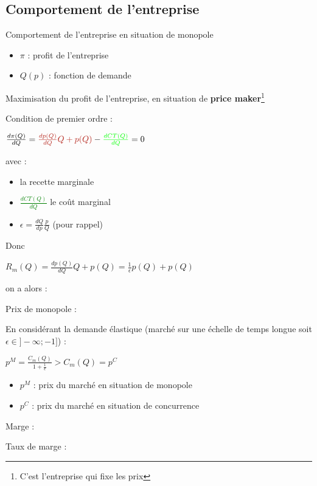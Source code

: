 \subsection{Comportement de l'entreprise}
Comportement de l'entreprise en situation de monopole
\begin{itemize}
    \item $\pi$ : profit de l'entreprise
    \item $Q(p)$ : fonction de demande
\end{itemize}
Maximisation du profit de l'entreprise, en situation de \textbf{price maker}\footnote{C'est l'entreprise qui fixe les prix}
\begin{center}
    \Large{}
\end{center}
Condition de premier ordre :
\begin{center}
    \Large{}
\end{center}
\begin{center}
    \Large{$\frac{d\pi(Q)}{dQ} = \textcolor{BrickRed}{\frac{dp(Q)}{dQ}Q + p(Q)} - \textcolor{green}{\frac{dCT(Q)}{dQ}} = 0$}
\end{center} avec :
\begin{itemize}
    \item{} la recette marginale
    \item \textcolor{green}{$\frac{dCT(Q)}{dQ}$} le coût marginal
    \item $\epsilon = \frac{dQ}{dp}\frac{p}{Q}$ (pour rappel)
\end{itemize}
Donc
\begin{center}
    $R_{m}(Q) = \frac{dp(Q)}{dQ}Q + p(Q) = \frac{1}{\epsilon}p(Q) + p(Q)$
\end{center}
on a alors : 
\begin{center}
    \Large{}
\end{center}
\newpage
Prix de monopole :
\begin{center}
    \LARGE{}
\end{center}
En considérant la demande élastique (marché sur une échelle de temps longue soit $\epsilon \in ]-\infty;-1]$) :
\begin{center}
    \Large{$p^{M} = \frac{C_{m}(Q)}{1+\frac{1}{\epsilon}} > C_{m}(Q) = p^{C}$}
\end{center}
\begin{itemize}
    \item $p^{M}$ : prix du marché en situation de monopole
    \item $p^{C}$ : prix du marché en situation de concurrence
\end{itemize}
Marge :
\begin{center}
    \Large{}
\end{center}
Taux de marge :
\begin{center}
    \Large{}
\end{center}
